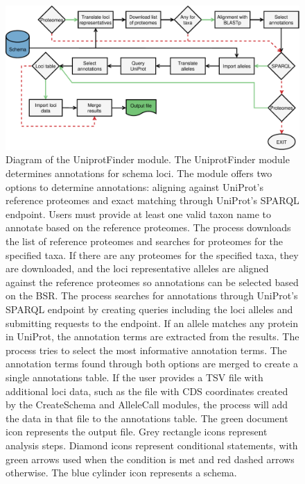 \newpage
\begin{figure}[h!]
    \centering
    \includegraphics[angle=0,width=\textwidth]{figures/chapter 2/FigureS21.pdf}
    \caption{Diagram of the UniprotFinder module. The UniprotFinder module determines annotations for schema loci. The module offers two options to determine annotations: aligning against UniProt's reference proteomes and exact matching through UniProt's SPARQL endpoint. Users must provide at least one valid taxon name to annotate based on the reference proteomes. The process downloads the list of reference proteomes and searches for proteomes for the specified taxa. If there are any proteomes for the specified taxa, they are downloaded, and the loci representative alleles are aligned against the reference proteomes so annotations can be selected based on the BSR. The process searches for annotations through UniProt's SPARQL endpoint by creating queries including the loci alleles and submitting requests to the endpoint. If an allele matches any protein in UniProt, the annotation terms are extracted from the results. The process tries to select the most informative annotation terms. The annotation terms found through both options are merged to create a single annotations table. If the user provides a TSV file with additional loci data, such as the file with CDS coordinates created by the CreateSchema and AlleleCall modules, the process will add the data in that file to the annotations table. The green document icon represents the output file. Grey rectangle icons represent analysis steps. Diamond icons represent conditional statements, with green arrows used when the condition is met and red dashed arrows otherwise. The blue cylinder icon represents a schema.}
    \label{fig:chap2_figureS21}
\end{figure}

